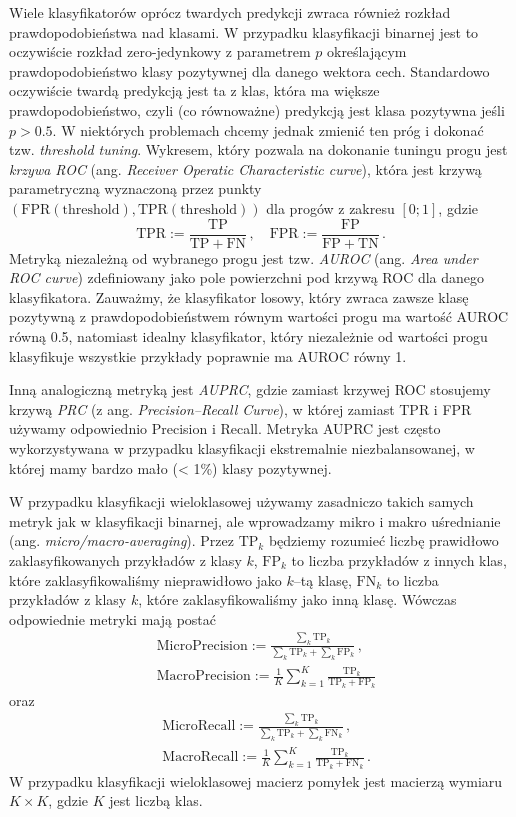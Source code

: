 \documentclass{myclass}
\begin{document}
Wiele klasyfikatorów oprócz twardych predykcji zwraca również rozkład prawdopodobieństwa nad
klasami. W przypadku klasyfikacji binarnej jest to oczywiście rozkład zero-jedynkowy z parametrem
\(p\) określającym prawdopodobieństwo klasy pozytywnej dla danego wektora cech. Standardowo
oczywiście twardą predykcją jest ta z klas, która ma większe prawdopodobieństwo, czyli (co
równoważne) predykcją jest klasa pozytywna jeśli \(p > 0.5\). W niektórych problemach chcemy jednak
zmienić ten próg i dokonać tzw. \emph{threshold tuning}. Wykresem, który pozwala na dokonanie
tuningu progu jest \emph{krzywa ROC} (ang. \emph{Receiver Operatic Characteristic curve}), która
jest krzywą parametryczną wyznaczoną przez punkty \((\mathrm{FPR}(\mathrm{threshold}),
\mathrm{TPR}(\mathrm{threshold}))\) dla progów z zakresu \([0;1]\), gdzie
\[
\mathrm{TPR} := \frac{\mathrm{TP}}{\mathrm{TP + FN}}\,,\quad \mathrm{FPR} := \frac{\mathrm{FP}}{\mathrm{FP + TN}}\,.
\]
Metryką niezależną od wybranego progu jest tzw. \emph{AUROC} (ang. \emph{Area under ROC curve})
zdefiniowany jako pole powierzchni pod krzywą ROC dla danego klasyfikatora. Zauważmy, że
klasyfikator losowy, który zwraca zawsze klasę pozytywną z prawdopodobieństwem równym wartości progu
ma wartość AUROC równą 0.5, natomiast idealny klasyfikator, który niezależnie od wartości progu
klasyfikuje wszystkie przykłady poprawnie ma AUROC równy 1.

Inną analogiczną metryką jest \emph{AUPRC}, gdzie zamiast krzywej ROC stosujemy krzywą \emph{PRC} (z
ang. \emph{Precision--Recall Curve}), w której zamiast TPR i FPR używamy odpowiednio Precision i
Recall. Metryka AUPRC jest często wykorzystywana w przypadku klasyfikacji ekstremalnie
niezbalansowanej, w której mamy bardzo mało (< 1\%) klasy pozytywnej.

W przypadku klasyfikacji wieloklasowej używamy zasadniczo takich samych metryk jak w klasyfikacji
binarnej, ale wprowadzamy mikro i makro uśrednianie (ang. \emph{micro/macro-averaging}). Przez
\(\mathrm{TP}_k\) będziemy rozumieć liczbę prawidłowo zaklasyfikowanych przykładów z klasy \(k\),
\(\mathrm{FP}_k\) to liczba przykładów z innych klas, które zaklasyfikowaliśmy nieprawidłowo jako
\(k\)--tą klasę, \(\mathrm{FN}_k\) to liczba przykładów z klasy \(k\), które zaklasyfikowaliśmy jako
inną klasę. Wówczas odpowiednie metryki mają postać
\[
\begin{split}
&\mathrm{MicroPrecision} := \frac{\sum_{k} \mathrm{TP}_k}{\sum_{k} \mathrm{TP}_k + \sum_{k} \mathrm{FP}_k}\,,\\
&\mathrm{MacroPrecision} := \frac{1}{K} \sum_{k=1}^K \frac{\mathrm{TP}_k}{\mathrm{TP}_k + \mathrm{FP}_k}
\end{split}
\]
oraz
\[
\begin{split}
&\mathrm{MicroRecall} := \frac{\sum_{k} \mathrm{TP}_k}{\sum_{k} \mathrm{TP}_k + \sum_{k} \mathrm{FN}_k}\,,\\
&\mathrm{MacroRecall} := \frac{1}{K} \sum_{k=1}^K \frac{\mathrm{TP}_k}{\mathrm{TP}_k + \mathrm{FN}_k}\,.
\end{split}
\]
W przypadku klasyfikacji wieloklasowej macierz pomyłek jest macierzą wymiaru \(K \times K\), gdzie
\(K\) jest liczbą klas.
\end{document}
